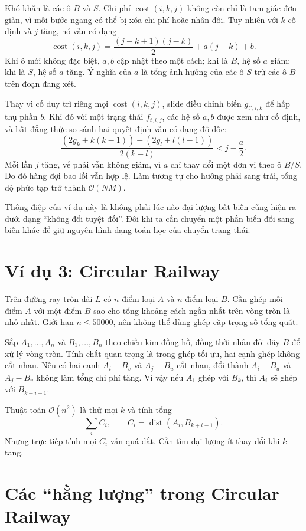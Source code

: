 \documentclass[11pt]{article}
\newcommand{\Oh}{\mathcal{O}}
\newcommand{\cost}{\operatorname{cost}}
\begin{document}
Khó khăn là các ô \(B\) và \(S\). Chi phí \(\cost(i,k,j)\) không còn chỉ là
tam giác đơn giản, vì mỗi bước ngang có thể bị xóa chi phí hoặc nhân đôi. Tuy
nhiên với \(k\) cố định và \(j\) tăng, nó vẫn có dạng
\[
  \cost(i,k,j)=\frac{(j-k+1)(j-k)}2+a(j-k)+b.
\]
Khi ô mới không đặc biệt, \(a,b\) cập nhật theo một cách; khi là \(B\), hệ số
\(a\) giảm; khi là \(S\), hệ số \(a\) tăng. Ý nghĩa của \(a\) là tổng ảnh
hưởng của các ô \(S\) trừ các ô \(B\) trên đoạn đang xét.

Thay vì cố duy trì riêng mọi \(\cost(i,k,j)\), slide điều chỉnh biến
\(g_{t',i,k}\) để hấp thụ phần \(b\). Khi đó với một trạng thái \(f_{t,i,j}\),
các hệ số \(a,b\) được xem như cố định, và bất đẳng thức so sánh hai quyết
định vẫn có dạng độ dốc:
\[
 \frac{(2g_k+k(k-1))-(2g_l+l(l-1))}{2(k-l)}
 < j-\frac a2.
\]
Mỗi lần \(j\) tăng, vế phải vẫn không giảm, vì \(a\) chỉ thay đổi một đơn vị
theo ô \(B/S\). Do đó hàng đợi bao lồi vẫn hợp lệ. Làm tương tự cho hướng
phải sang trái, tổng độ phức tạp trở thành \(\Oh(NM)\).

Thông điệp của ví dụ này là không phải lúc nào đại lượng bất biến cũng hiện
ra dưới dạng ``không đổi tuyệt đối''. Đôi khi ta cần chuyển một phần biến
đổi sang biến khác để giữ nguyên hình dạng toán học của chuyển trạng thái.

\section{Ví dụ 3: Circular Railway}

Trên đường ray tròn dài \(L\) có \(n\) điểm loại \(A\) và \(n\) điểm loại
\(B\). Cần ghép mỗi điểm \(A\) với một điểm \(B\) sao cho tổng khoảng cách
ngắn nhất trên vòng tròn là nhỏ nhất. Giới hạn \(n\le 50000\), nên không thể
dùng ghép cặp trọng số tổng quát.

Sắp \(A_1,\ldots,A_n\) và \(B_1,\ldots,B_n\) theo chiều kim đồng hồ, đồng
thời nhân đôi dãy \(B\) để xử lý vòng tròn. Tính chất quan trọng là trong
ghép tối ưu, hai cạnh ghép không cắt nhau. Nếu có hai cạnh \(A_i-B_v\) và
\(A_j-B_u\) cắt nhau, đổi thành \(A_i-B_u\) và \(A_j-B_v\) không làm tổng
chi phí tăng. Vì vậy nếu \(A_1\) ghép với \(B_k\), thì \(A_i\) sẽ ghép với
\(B_{k+i-1}\).

Thuật toán \(\Oh(n^2)\) là thử mọi \(k\) và tính tổng
\[
  \sum_i C_i,\qquad C_i=\operatorname{dist}(A_i,B_{k+i-1}).
\]
Nhưng trực tiếp tính mọi \(C_i\) vẫn quá đắt. Cần tìm đại lượng ít thay đổi
khi \(k\) tăng.

\section{Các ``hằng lượng'' trong Circular Railway}
\end{document}
